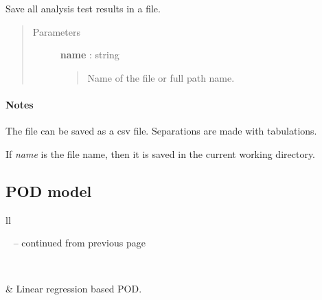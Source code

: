 \documentclass[letterpaper,10pt,english]{sphinxmanual}
\begin{document}
\begin{fulllineitems}
\begin{fulllineitems}
\end{fulllineitems}


\begin{fulllineitems}
\label{_generated/otpod.UnivariateLinearModelAnalysis:otpod.UnivariateLinearModelAnalysis.saveResults}
Save all analysis test results in a file.
\begin{quote}\begin{description}
\item[{Parameters}] \leavevmode
\textbf{name} : string
\begin{quote}

Name of the file or full path name.
\end{quote}

\end{description}\end{quote}
\paragraph{Notes}

The file can be saved as a csv file. Separations are made with tabulations.

If \emph{name} is the file name, then it is saved in the current working
directory.

\end{fulllineitems}


\end{fulllineitems}



\subsection{POD model}
\label{user_manual:pod-model}
\begin{longtable}{ll}
\hline
\endfirsthead

%
{{\textsf{\tablename\ \thetable{} -- continued from previous page}}} \\
\hline
\endhead

\hline {} \\ \hline
\endfoot

\endlastfoot


{\hyperref[_generated/otpod.UnivariateLinearModelPOD:otpod.UnivariateLinearModelPOD]{\emph{}}}
 & 
Linear regression based POD.
\\
\hline\end{longtable}
\end{document}
